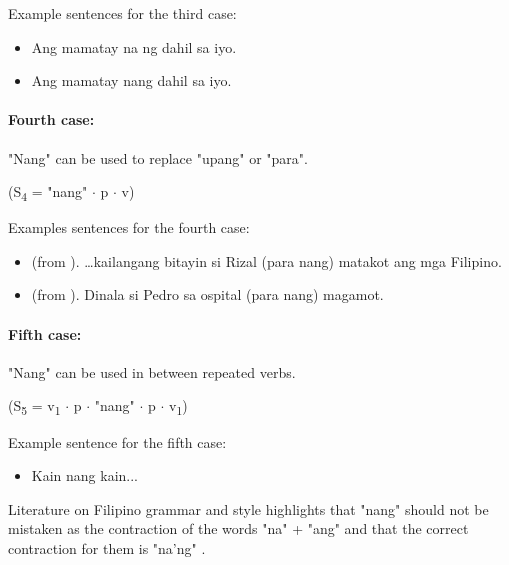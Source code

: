 \begin{example}
      Example sentences for the third case:
\end{example}
\begin{itemize}
      \item Ang mamatay na ng dahil sa iyo.
      \item Ang mamatay nang dahil sa iyo.
\end{itemize}

\paragraph{Fourth case:} "Nang" can be used to replace "upang" or "para".
\begin{center}
      (S\textsubscript{4} = "nang" \(\cdot\) p \(\cdot\) v)
\end{center}

\begin{example}
      Examples sentences for the fourth case:
\end{example}
\begin{itemize}
      \item (from \cite{OOP}). …kailangang bitayin si Rizal (para {\textpipe} nang)
            matakot ang mga Filipino.
      \item (from \cite{OOP}). Dinala si Pedro sa ospital (para {\textpipe} nang)
            magamot.
\end{itemize}

\paragraph{Fifth case:} "Nang" can be used in between repeated verbs.
\begin{center}
      (S\textsubscript{5} = v\textsubscript{1} \(\cdot\) p \(\cdot\) "nang"
      \(\cdot\) p \(\cdot\) v\textsubscript{1})
\end{center}

\begin{example}
      Example sentence for the fifth case:
\end{example}
\begin{itemize}
      \item Kain nang kain...
\end{itemize}

Literature on Filipino grammar and style highlights that "nang" should not be
mistaken as the contraction of the words "na" + "ang" and that the correct
contraction for them is "na'ng" \cite{OOP}.


